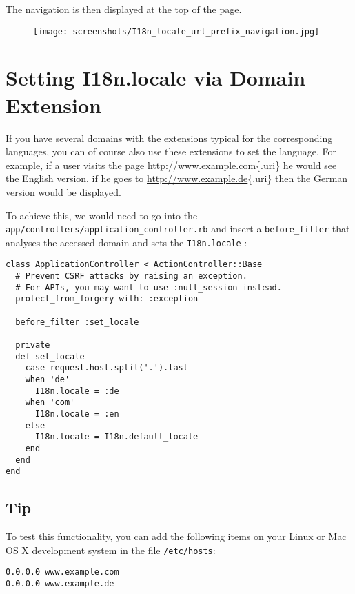 \documentclass[a4paper]{book}
\begin{document}
The navigation is then displayed at the top of the page.

\begin{figure}[htbp]
\centering
\texttt{[image: screenshots/I18n\_locale\_url\_prefix\_navigation.jpg]}
\end{figure}

\section{Setting I18n.locale via Domain Extension}\label{setting-i18n.locale-via-domain-extension}

If you have several domains with the extensions typical for the corresponding languages, you can of course also use these extensions to set the language. For example, if a user visits the page \url{http://www.example.com}\{.uri\} he would see the English version, if he goes to \url{http://www.example.de}\{.uri\} then the German version would be displayed.

To achieve this, we would need to go into the \texttt{app/controllers/application\_controller.rb} and insert a \texttt{before\_filter} that analyses the accessed domain and sets the \texttt{I18n.locale} :

\begin{shaded}\begin{verbatim}
class ApplicationController < ActionController::Base
  # Prevent CSRF attacks by raising an exception.
  # For APIs, you may want to use :null_session instead.
  protect_from_forgery with: :exception

  before_filter :set_locale

  private
  def set_locale
    case request.host.split('.').last
    when 'de'
      I18n.locale = :de
    when 'com'
      I18n.locale = :en
    else
      I18n.locale = I18n.default_locale
    end
  end
end
\end{verbatim}\end{shaded}

\subsection{Tip}\label{tip-18}

To test this functionality, you can add the following items on your Linux or Mac OS X development system in the file \texttt{/etc/hosts}:

\begin{shaded}\begin{verbatim}
0.0.0.0 www.example.com
0.0.0.0 www.example.de
\end{verbatim}\end{shaded}
\end{document}
